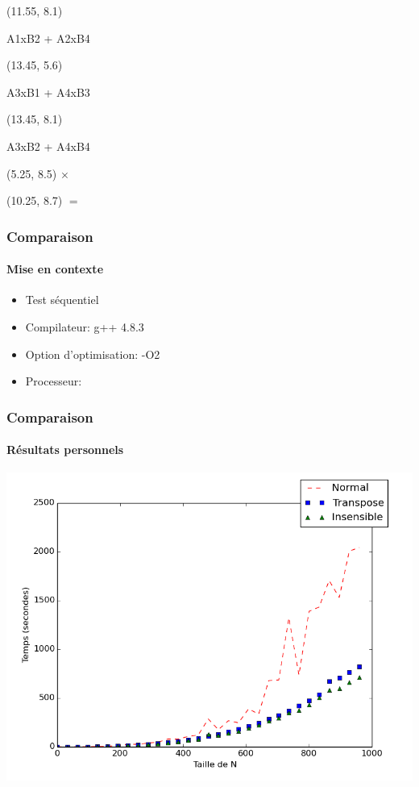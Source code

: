 \documentclass{beamer}
\begin{document}
\begin{frame}[fragile]
\begin{textblock}{1}(11.55, 8.1)
\begin{center}
	 A1xB2 + A2xB4
	 \end{center}	
\end{textblock}

\begin{textblock}{1}(13.45, 5.6)
\begin{center}
	 A3xB1 + A4xB3
	 \end{center}	
\end{textblock}

\begin{textblock}{1}(13.45, 8.1)
\begin{center}
	 A3xB2 + A4xB4
	 \end{center}	
\end{textblock}

\begin{textblock}{5}(5.25, 8.5)
	 \Huge{$\times$}
\end{textblock}

\begin{textblock}{5}(10.25, 8.7)
	 \Huge{$=$}
\end{textblock}

\end{frame}


\begin{frame}
\frametitle{Comparaison}
\framesubtitle{Mise en contexte}
\begin{itemize}
\item Test séquentiel
\item Compilateur: g++ 4.8.3
\item Option d'optimisation: -O2
\item Processeur: 
\end{itemize}
\end{frame}

\begin{frame}
\frametitle{Comparaison}
\framesubtitle{Résultats personnels}
\begin{center}
\colorbox{white}{\includegraphics[scale=0.4]{matmult_all.png}}
\end{center}
\end{frame}
\end{document}
